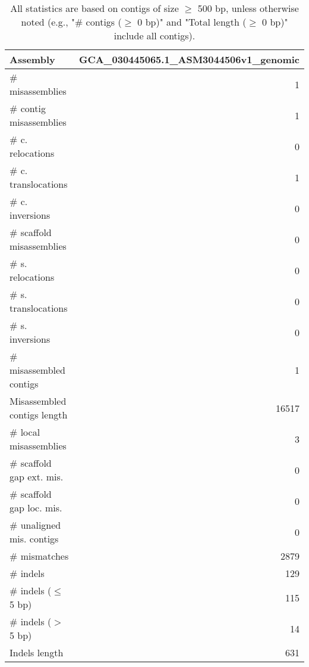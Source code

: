 \documentclass[12pt,a4paper]{article}
\begin{document}
\begin{table}[ht]
\begin{center}
\caption{All statistics are based on contigs of size $\geq$ 500 bp, unless otherwise noted (e.g., "\# contigs ($\geq$ 0 bp)" and "Total length ($\geq$ 0 bp)" include all contigs).}
\begin{tabular}{|l*{1}{|r}|}
\hline
Assembly & GCA\_030445065.1\_ASM3044506v1\_genomic \\ \hline
\# misassemblies & 1 \\ \hline
\hspace{2mm}\# contig misassemblies & 1 \\ \hline
\hspace{5mm}\# c. relocations & 0 \\ \hline
\hspace{5mm}\# c. translocations & 1 \\ \hline
\hspace{5mm}\# c. inversions & 0 \\ \hline
\hspace{2mm}\# scaffold misassemblies & 0 \\ \hline
\hspace{5mm}\# s. relocations & 0 \\ \hline
\hspace{5mm}\# s. translocations & 0 \\ \hline
\hspace{5mm}\# s. inversions & 0 \\ \hline
\# misassembled contigs & 1 \\ \hline
Misassembled contigs length & 16517 \\ \hline
\# local misassemblies & 3 \\ \hline
\# scaffold gap ext. mis. & 0 \\ \hline
\# scaffold gap loc. mis. & 0 \\ \hline
\# unaligned mis. contigs & 0 \\ \hline
\# mismatches & 2879 \\ \hline
\# indels & 129 \\ \hline
\hspace{5mm}\# indels ($\leq$ 5 bp) & 115 \\ \hline
\hspace{5mm}\# indels ($>$ 5 bp) & 14 \\ \hline
Indels length & 631 \\ \hline
\end{tabular}
\end{center}
\end{table}
\end{document}
